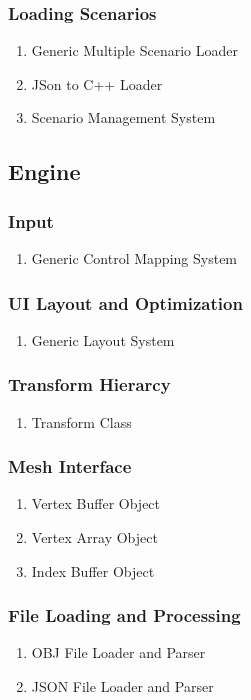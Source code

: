 \subsubsection{Loading Scenarios}
\begin{enumerate}
\item Generic Multiple Scenario Loader
\item JSon to C++ Loader
\item Scenario Management System
\end{enumerate}


\subsection{Engine}
\subsubsection{Input}
\begin{enumerate}
\item Generic Control Mapping System
\end{enumerate}
\subsubsection{UI Layout and Optimization}
\begin{enumerate}
\item Generic Layout System
\end{enumerate}
\subsubsection{Transform Hierarcy}
\begin{enumerate}
\item Transform Class
\end{enumerate}
\subsubsection{Mesh Interface}
\begin{enumerate}
\item Vertex Buffer Object
\item Vertex Array Object
\item Index Buffer Object
\end{enumerate}
\subsubsection{File Loading and Processing}
\begin{enumerate}
\item OBJ File Loader and Parser
\item JSON File Loader and Parser
\end{enumerate}
